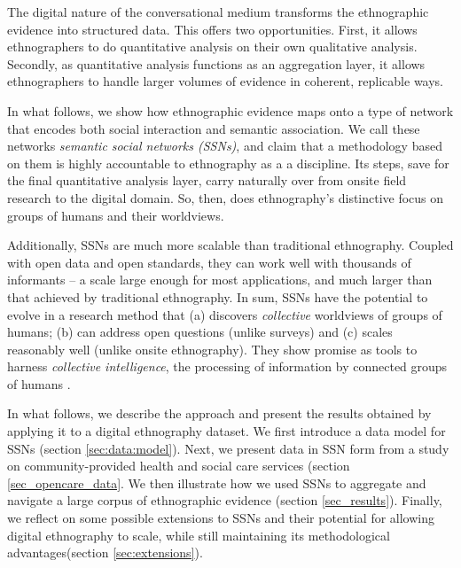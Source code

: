 \documentclass{llncs}
\begin{document}
The digital nature of the conversational medium transforms the ethnographic evidence into structured data. This offers two opportunities. First, it allows ethnographers to do quantitative analysis on their own qualitative analysis. Secondly, as quantitative analysis functions as an aggregation layer, it allows ethnographers to handle larger volumes of evidence in coherent, replicable ways.

In what follows, we show how ethnographic evidence maps onto a type of network that encodes both social interaction and semantic association. We call these networks \emph{semantic social networks (SSNs)}, and claim that a methodology based on them is highly accountable to ethnography as a a discipline. Its steps, save for the final quantitative analysis layer, carry naturally over from onsite field research to the digital domain. So, then, does ethnography's distinctive focus on groups of humans and their worldviews.

Additionally, SSNs are much more scalable than traditional ethnography. Coupled with open data  and open standards, they can work well with thousands of informants – a scale large enough for most applications, and much larger than that achieved by traditional ethnography. In sum, SSNs have the potential to evolve in a research method that (a) discovers \textit{collective} worldviews of groups of humans; (b) can address open questions (unlike surveys) and (c) scales reasonably well (unlike onsite ethnography). They show promise as tools to harness \emph{collective intelligence}, the processing of information by connected groups of humans \cite{levy1997collective}.

\indent In what follows, we describe the approach and present the results obtained by applying it to a digital ethnography dataset. We first introduce a data model for SSNs (section \ref{sec:data:model}). Next, we present data in SSN form from a study on community-provided health and social care services (section \ref{sec_opencare_data}. We then illustrate how we used SSNs to aggregate and navigate a large corpus of ethnographic evidence (section \ref{sec_results}). Finally, we reflect on some possible extensions to SSNs and their potential for allowing digital ethnography to scale, while still maintaining its methodological advantages(section \ref{sec:extensions}). 

\end{document}
